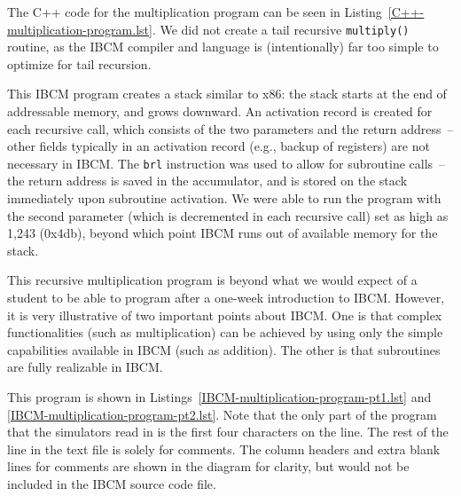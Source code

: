 The C++ code for the multiplication program can be seen in
Listing~\ref{C++-multiplication-program.lst}.  We did not create a
tail recursive {\tt multiply()} routine, as the IBCM compiler and
language is (intentionally) far too simple to optimize for tail
recursion.

This IBCM program creates a stack similar to x86: the stack starts at
the end of addressable memory, and grows downward.  An activation
record is created for each recursive call, which consists of the two
parameters and the return address~-- other fields typically in an
activation record (e.g., backup of registers) are not necessary in
IBCM.  The {\tt brl} instruction was used to allow for subroutine
calls~-- the return address is saved in the accumulator, and is stored
on the stack immediately upon subroutine activation.  We were able to
run the program with the second parameter (which is decremented in
each recursive call) set as high as 1,243 (0x4db), beyond which point
IBCM runs out of available memory for the stack.

This recursive multiplication program is beyond what we would expect
of a student to be able to program after a one-week introduction to
IBCM.  However, it is very illustrative of two important points about
IBCM.  One is that complex functionalities (such as multiplication)
can be achieved by using only the simple capabilities available in
IBCM (such as addition).  The other is that subroutines are fully
realizable in IBCM.

This program is shown in
Listings~\ref{IBCM-multiplication-program-pt1.lst} and
\ref{IBCM-multiplication-program-pt2.lst}.  Note that the only part of
the program that the simulators read in is the first four characters
on the line.  The rest of the line in the text file is solely for
comments.  The column headers and extra blank lines for comments are
shown in the diagram for clarity, but would not be included in the
IBCM source code file.

\begin{figure}

\end{figure}

\begin{figure}

\end{figure}

